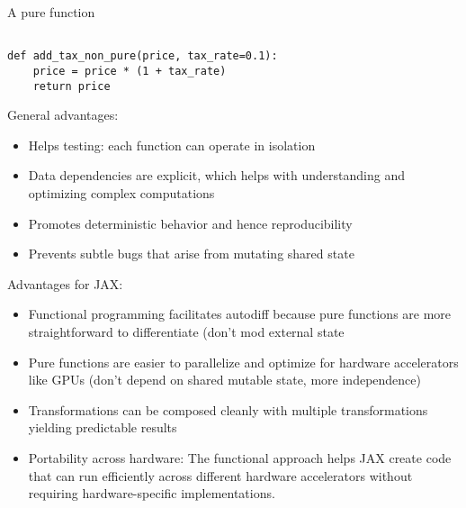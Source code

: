 \begin{frame}[fragile]

    A pure function

    \begin{verbatim}

def add_tax_non_pure(price, tax_rate=0.1):
    price = price * (1 + tax_rate)    
    return price 
    \end{verbatim}
    
\end{frame}


\begin{frame}

    General advantages:

    \begin{itemize}
        \item Helps testing: each function can operate in isolation
        \item Data dependencies are explicit, which helps with understanding and optimizing complex computations 
        \item Promotes deterministic behavior and hence reproducibility
        \item Prevents subtle bugs that arise from mutating shared state
    \end{itemize}

\end{frame}



\begin{frame}
    
    Advantages for JAX:

     \begin{itemize}
         \item Functional programming facilitates autodiff because
             pure functions are more straightforward to differentiate (don't mod
             external state
         \item Pure functions are easier to
             parallelize and optimize for hardware accelerators like GPUs (don't
             depend on shared mutable state, more independence)
         \item Transformations can be composed cleanly with multiple
             transformations yielding predictable results
        \item Portability across hardware: The functional approach helps JAX
            create code that can run efficiently across different hardware
            accelerators without requiring hardware-specific implementations.
     \end{itemize}


\end{frame}

